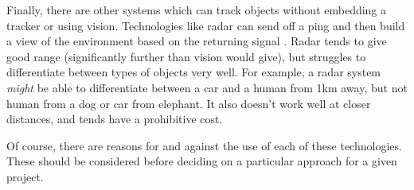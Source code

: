 Finally, there are other systems which can track objects without embedding a tracker or using vision. Technologies like radar can send off a ping and then build a view of the environment based on the returning signal \cite{sakpere2017state}. Radar tends to give good range (significantly further than vision would give), but struggles to differentiate between types of objects very well. For example, a radar system \emph{might} be able to differentiate between a car and a human from 1km away, but not human from a dog or car from elephant. It also doesn't work well at closer distances, and tends have a prohibitive cost.

Of course, there are reasons for and against the use of each of these technologies. These should be considered before deciding on a particular approach for a given project.

